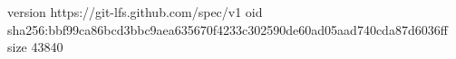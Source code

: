 version https://git-lfs.github.com/spec/v1
oid sha256:bbf99ca86bcd3bbc9aea635670f4233c302590de60ad05aad740cda87d6036ff
size 43840
